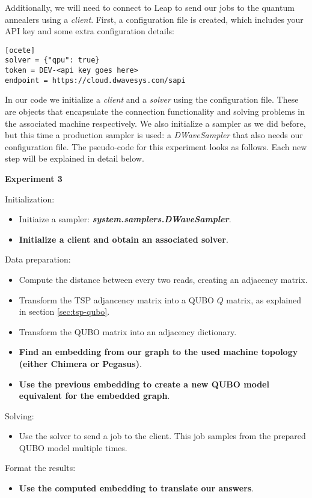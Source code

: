 Additionally, we will need to connect to Leap to send our jobs to the quantum annealers using a \emph{client}. First, a configuration file is created, which includes your API key and some extra configuration details:

\begin{verbatim}
[ocete]
solver = {"qpu": true}
token = DEV-<api key goes here>
endpoint = https://cloud.dwavesys.com/sapi
\end{verbatim}

In our code we initialize a \emph{client} and a \emph{solver} using the configuration file. These are objects that encapsulate the connection functionality and solving problems in the associated machine respectively. We also initialize a sampler as we did before, but this time a production sampler is used: a \emph{DWaveSampler} that also needs our configuration file. The pseudo-code for this experiment looks as follows. Each new step will be explained in detail below.

\begin{algorithm}
	\caption*{\textbf{Experiment 3}}
	
	Initialization:
	\begin{itemize}
		\item Initiaize a sampler: \textbf{\emph{system.samplers.DWaveSampler}}.
		\item \textbf{Initialize a client and obtain an associated solver}.
	\end{itemize}
	
	Data preparation:
	\begin{itemize}
		\item Compute the distance between every two reads, creating an adjacency matrix.
		\item Transform the TSP adjancency matrix into a QUBO $Q$ matrix, as explained in section \ref{sec:tsp-qubo}.
		\item Transform the QUBO matrix into an adjacency dictionary.
		\item \textbf{Find an embedding from our graph to the used machine topology (either Chimera or Pegasus)}.
		\item \textbf{Use the previous embedding to create a new QUBO model equivalent for the embedded graph}.
	\end{itemize}
	
	Solving:
	\begin{itemize}
		\item Use the solver to send a job to the client. This job samples from the prepared QUBO model multiple times.
	\end{itemize}
	
	Format the results:
	\begin{itemize}
		\item \textbf{Use the computed embedding to translate our answers}.
	\end{itemize}
\end{algorithm}

